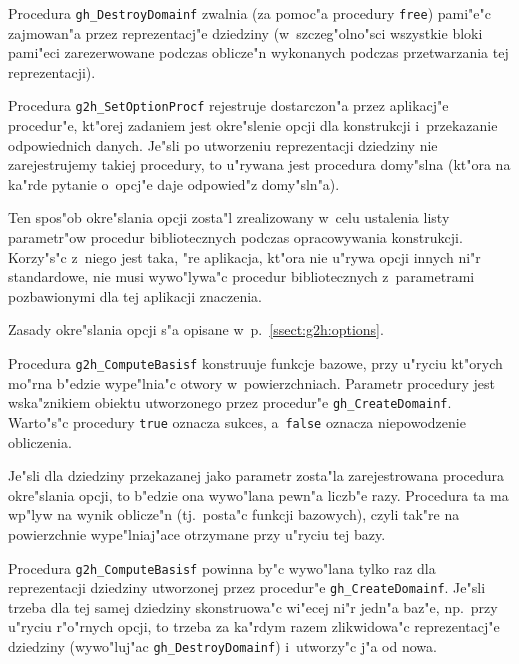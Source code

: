 \vspace{\medskipamount}
Procedura \texttt{gh\_DestroyDomainf} zwalnia (za pomoc"a procedury \texttt{free})
pami"e"c zajmowan"a przez reprezentacj"e dziedziny (w~szczeg"olno"sci wszystkie
bloki pami"eci zarezerwowane podczas oblicze"n wykonanych podczas przetwarzania
tej reprezentacji).

\vspace{\bigskipamount}
Procedura \texttt{g2h\_SetOptionProcf} rejestruje dostarczon"a przez aplikacj"e
procedur"e, kt"orej zadaniem jest okre"slenie opcji dla konstrukcji
i~przekazanie odpowiednich danych. Je"sli po utworzeniu reprezentacji
dziedziny nie zarejestrujemy takiej procedury, to u"rywana jest procedura
domy"slna (kt"ora na ka"rde pytanie o~opcj"e daje odpowied"z domy"sln"a).

Ten spos"ob okre"slania opcji zosta"l zrealizowany w~celu ustalenia
listy parametr"ow procedur bibliotecznych podczas opracowywania konstrukcji.
Korzy"s"c z~niego jest taka, "re aplikacja, kt"ora nie u"rywa opcji
innych ni"r standardowe, nie musi wywo"lywa"c procedur bibliotecznych
z~parametrami pozbawionymi dla tej aplikacji znaczenia.

Zasady okre"slania opcji s"a opisane w~p.~\ref{ssect:g2h:options}.

\vspace{\bigskipamount}
Procedura \texttt{g2h\_ComputeBasisf} konstruuje funkcje bazowe, przy u"ryciu
kt"orych mo"rna b"edzie wype"lnia"c otwory w~powierzchniach.
Parametr procedury jest wska"znikiem obiektu utworzonego przez
procedur"e \texttt{gh\_CreateDomainf}. Warto"s"c procedury \texttt{true}
oznacza sukces, a~\texttt{false} oznacza niepowodzenie obliczenia.

Je"sli dla dziedziny przekazanej jako parametr zosta"la zarejestrowana
procedura okre"slania opcji, to b"edzie ona wywo"lana pewn"a liczb"e razy.
Procedura ta ma wp"lyw na wynik oblicze"n (tj.\ posta"c funkcji bazowych),
czyli tak"re na powierzchnie wype"lniaj"ace otrzymane przy u"ryciu tej bazy.

Procedura \texttt{g2h\_ComputeBasisf} powinna by"c wywo"lana tylko raz
dla reprezentacji dziedziny utworzonej przez procedur"e
\texttt{gh\_CreateDomainf}. Je"sli trzeba dla tej samej dziedziny
skonstruowa"c wi"ecej ni"r jedn"a baz"e, np.\ przy u"ryciu r"o"rnych opcji,
to trzeba za ka"rdym razem zlikwidowa"c reprezentacj"e dziedziny (wywo"luj"ac
\texttt{gh\_DestroyDomainf}) i~utworzy"c j"a od nowa.

